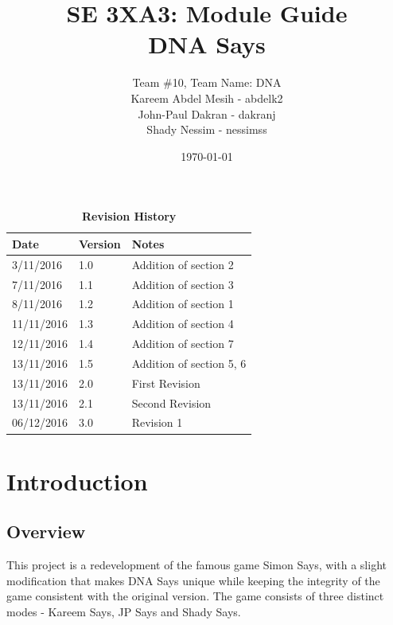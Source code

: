 \documentclass[12pt, titlepage]{article}
\title{SE 3XA3: Module Guide\\DNA Says}
\author{Team \#10, Team Name: DNA
		\\ Kareem Abdel Mesih - abdelk2
		\\ John-Paul Dakran - dakranj
		\\ Shady Nessim - nessimss
}
\date{\today}
\begin{document}
\maketitle

\tableofcontents
\listoftables
\listoffigures

\begin{table}[H]
\caption{\bf Revision History}
\begin{tabularx}{\textwidth}{p{3cm}p{2cm}X}
\toprule {\bf Date} & {\bf Version} & {\bf Notes}\\
\midrule
3/11/2016 & 1.0 & Addition of section 2\\
7/11/2016 & 1.1 & Addition of section 3\\
8/11/2016 & 1.2 & Addition of section 1\\
11/11/2016 & 1.3 & Addition of section 4\\
12/11/2016 & 1.4 & Addition of section 7\\
13/11/2016 & 1.5 & Addition of section 5, 6\\
13/11/2016 & 2.0 & First Revision\\
13/11/2016 & 2.1 & Second Revision\\
06/12/2016 & 3.0 & Revision 1\\
\bottomrule
\end{tabularx}
\end{table}

\newpage


\section{Introduction}

\subsection{Overview}
\par This project is a redevelopment of the famous game Simon Says, with a slight modification that makes DNA Says unique while keeping the integrity of the game consistent with the original version. The game consists of three distinct modes - Kareem Says, JP Says and Shady Says.
\end{document}
